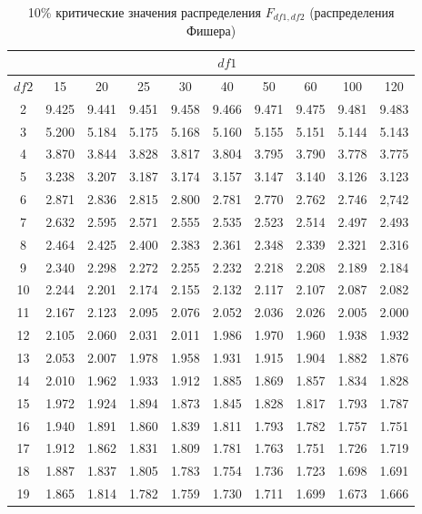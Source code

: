 \documentclass[12pt]{article}
\begin{document}
\begin{table}
\caption{10\% критические значения распределения $F_{df1,df2}$
(распределения Фишера) }
\begin{center}
{\footnotesize
\begin{tabular}{|c|c|c|c|c|c|c|c|c|c|}
  \hline
  & \multicolumn{9}{|c|}{$df1$} \\ \hline
$df2$ & 15&  20&  25 & 30 & 40 & 50 & 60 & 100 &120\\ \hline \hline
2 & 9.425&   9.441& 9.451& 9.458& 9.466&   9.471&   9.475& 9.481& 9.483\\
3 &  5.200& 5.184& 5.175& 5.168& 5.160&   5.155&   5.151&   5.144& 5.143\\
4 &  3.870& 3.844& 3.828& 3.817& 3.804&   3.795&   3.790&   3.778&   3.775\\
5 & 3.238& 3.207& 3.187& 3.174& 3.157&   3.147&   3.140&   3.126&3.123\\
6 & 2.871& 2.836 &2.815& 2.800& 2.781&   2.770&   2.762&   2.746&2,742\\
7 & 2.632 &2.595 &2.571 &2.555 &2.535 &2.523   &2.514   &2.497 &2.493\\
8 & 2.464 &2.425 &2.400 &2.383 &2.361 &2.348 &2.339 &2.321 &2.316\\
9 & 2.340 &2.298 &2.272 &2.255 &2.232 &2.218 &2.208 &2.189 &2.184\\
10 & 2.244 &2.201 &2.174 &2.155 &2.132 &2.117 &2.107 &2.087 &2.082\\
11 & 2.167 &2.123 &2.095 &2.076 &2.052 &2.036 &2.026 &2.005 &2.000\\
12 & 2.105 &2.060 &2.031 &2.011 &1.986 &1.970 &1.960 &1.938 &1.932\\
13 & 2.053 &2.007 &1.978 &1.958 &1.931 &1.915 &1.904 &1.882 &1.876\\
14 & 2.010 &1.962 &1.933 &1.912 &1.885 &1.869 &1.857 &1.834 &1.828\\
15 & 1.972 &1.924 &1.894 &1.873 &1.845 &1.828 &1.817 &1.793 &1.787\\
16 & 1.940 &1.891 &1.860 &1.839 &1.811 &1.793 &1.782 &1.757 &1.751\\
17 & 1.912 &1.862 &1.831 &1.809 &1.781 &1.763 &1.751 &1.726 &1.719\\
18 & 1.887 &1.837 &1.805 &1.783 &1.754 &1.736 &1.723 &1.698 &1.691\\
19 & 1.865 &1.814 &1.782 &1.759 &1.730 &1.711 &1.699 &1.673 &1.666\\

\end{tabular}}
\end{center}
\end{table}
\end{document}
